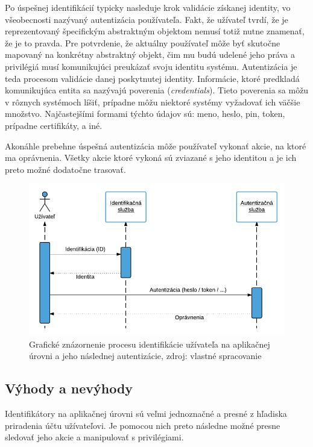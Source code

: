 \documentclass[
  printed, %
  table,   %
  lof,     %
  lot,     %
]{fithesis3}
\begin{document}
Po úspešnej identifikácií typicky nasleduje krok validácie získanej identity,
vo všeobecnosti nazývaný autentizácia používateľa. Fakt, že užívateľ tvrdí,
že je reprezentovaný špecifickým abstraktným objektom nemusí totiž nutne
znamenať, že je to pravda. Pre potvrdenie, že aktuálny používateľ môže byť
skutočne mapovaný na konkrétny abstraktný objekt, čim mu budú udelené jeho
práva a privilégiá musí komunikujúci preukázať svoju identitu systému.
Autentizácia je teda procesom validácie danej poskytnutej identity. Informácie,
ktoré predkladá komunikujúca entita sa nazývajú poverenia
(\textit{credentials}). Tieto poverenia sa môžu v rôznych systémoch líšiť, 
prípadne môžu niektoré systémy vyžadovať ich väčšie množstvo. Najčastejšími
formami týchto údajov sú: meno, heslo, pin, token, prípadne certifikáty, a iné.

Akonáhle prebehne úspešná autentizácia môže používateľ vykonať akcie, na ktoré
ma oprávnenia. Všetky akcie ktoré vykoná sú zviazané s jeho identitou a je ich
preto možné dodatočne trasovať.

\begin{figure}[h]
  \centering
    \includegraphics[width=.99\textwidth]{images/tech-app.png}
  \caption{Grafické znázornenie procesu identifikácie užívateľa na aplikačnej
  úrovni a jeho následnej autentizácie, zdroj: vlastné spracovanie}
  \label{fig:tech-app}
\end{figure}

\subsection{Výhody a nevýhody}
Identifikátory na aplikačnej úrovni sú veľmi jednoznačné a presné z hľadiska
priradenia účtu užívateľovi. Je pomocou nich preto následne možné presne
sledovať jeho akcie a manipulovať s privilégiami.
\end{document}
